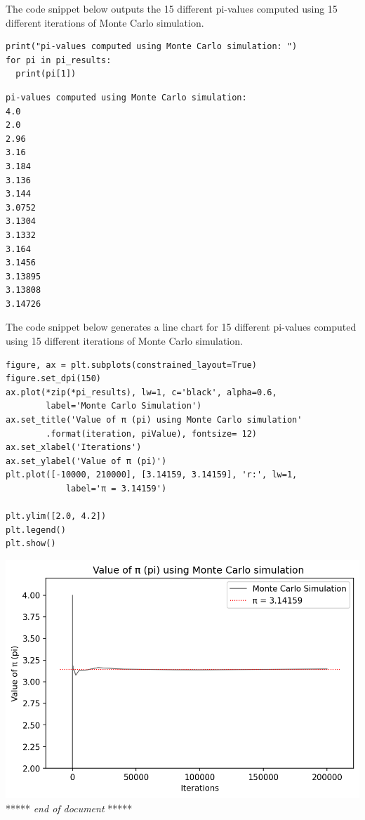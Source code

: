 \documentclass[UTF8, letter]{article}
\begin{document}
\begin{flushleft} \noindent
The code snippet below outputs the 15 different pi-values computed using 15 different iterations of Monte Carlo simulation.
\end{flushleft}

\begin{codeblock}
\begin{verbatim}
print("pi-values computed using Monte Carlo simulation: ")
for pi in pi_results:
  print(pi[1])
\end{verbatim}
\end{codeblock}

\begin{outputblock}
\begin{verbatim}
pi-values computed using Monte Carlo simulation:
4.0
2.0
2.96
3.16
3.184
3.136
3.144
3.0752
3.1304
3.1332
3.164
3.1456
3.13895
3.13808
3.14726
\end{verbatim}
\end{outputblock}

\pagebreak
\begin{flushleft} \noindent
The code snippet below generates a line chart for 15 different pi-values computed using 15 different iterations of Monte Carlo simulation.
\end{flushleft}

\begin{codeblock}
\begin{verbatim}
figure, ax = plt.subplots(constrained_layout=True)
figure.set_dpi(150)
ax.plot(*zip(*pi_results), lw=1, c='black', alpha=0.6, 
		label='Monte Carlo Simulation')
ax.set_title('Value of π (pi) using Monte Carlo simulation'
		.format(iteration, piValue), fontsize= 12)
ax.set_xlabel('Iterations')
ax.set_ylabel('Value of π (pi)')
plt.plot([-10000, 210000], [3.14159, 3.14159], 'r:', lw=1, 
			label='π = 3.14159')

plt.ylim([2.0, 4.2])
plt.legend()
plt.show()		
\end{verbatim}
\end{codeblock}

\begin{center}
\includegraphics[width=\textwidth]{output-2.png}
\linebreak
\linebreak	
***** \textit{end of document} *****
\end{center}
\end{document}
